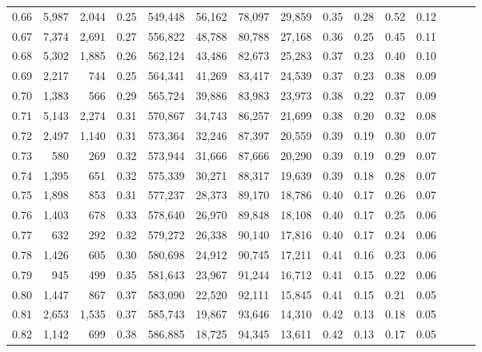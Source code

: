 \begin{tabular}{rrrrrrrrrrrrrrr}
0.66 &   5,987 &  2,044 &  0.25 &  549,448 &   56,162 &   78,097 &   29,859 &  0.35 &  0.28 &  0.52 &      0.12 \\
0.67 &   7,374 &  2,691 &  0.27 &  556,822 &   48,788 &   80,788 &   27,168 &  0.36 &  0.25 &  0.45 &      0.11 \\
0.68 &   5,302 &  1,885 &  0.26 &  562,124 &   43,486 &   82,673 &   25,283 &  0.37 &  0.23 &  0.40 &      0.10 \\
0.69 &   2,217 &    744 &  0.25 &  564,341 &   41,269 &   83,417 &   24,539 &  0.37 &  0.23 &  0.38 &      0.09 \\
0.70 &   1,383 &    566 &  0.29 &  565,724 &   39,886 &   83,983 &   23,973 &  0.38 &  0.22 &  0.37 &      0.09 \\
0.71 &   5,143 &  2,274 &  0.31 &  570,867 &   34,743 &   86,257 &   21,699 &  0.38 &  0.20 &  0.32 &      0.08 \\
0.72 &   2,497 &  1,140 &  0.31 &  573,364 &   32,246 &   87,397 &   20,559 &  0.39 &  0.19 &  0.30 &      0.07 \\
0.73 &     580 &    269 &  0.32 &  573,944 &   31,666 &   87,666 &   20,290 &  0.39 &  0.19 &  0.29 &      0.07 \\
0.74 &   1,395 &    651 &  0.32 &  575,339 &   30,271 &   88,317 &   19,639 &  0.39 &  0.18 &  0.28 &      0.07 \\
0.75 &   1,898 &    853 &  0.31 &  577,237 &   28,373 &   89,170 &   18,786 &  0.40 &  0.17 &  0.26 &      0.07 \\
0.76 &   1,403 &    678 &  0.33 &  578,640 &   26,970 &   89,848 &   18,108 &  0.40 &  0.17 &  0.25 &      0.06 \\
0.77 &     632 &    292 &  0.32 &  579,272 &   26,338 &   90,140 &   17,816 &  0.40 &  0.17 &  0.24 &      0.06 \\
0.78 &   1,426 &    605 &  0.30 &  580,698 &   24,912 &   90,745 &   17,211 &  0.41 &  0.16 &  0.23 &      0.06 \\
0.79 &     945 &    499 &  0.35 &  581,643 &   23,967 &   91,244 &   16,712 &  0.41 &  0.15 &  0.22 &      0.06 \\
0.80 &   1,447 &    867 &  0.37 &  583,090 &   22,520 &   92,111 &   15,845 &  0.41 &  0.15 &  0.21 &      0.05 \\
0.81 &   2,653 &  1,535 &  0.37 &  585,743 &   19,867 &   93,646 &   14,310 &  0.42 &  0.13 &  0.18 &      0.05 \\
0.82 &   1,142 &    699 &  0.38 &  586,885 &   18,725 &   94,345 &   13,611 &  0.42 &  0.13 &  0.17 &      0.05 \\

\end{tabular}
